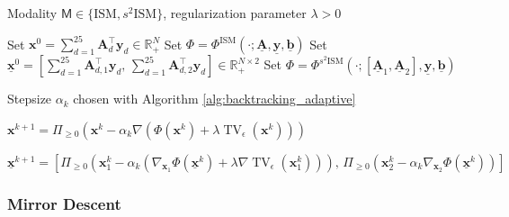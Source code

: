 \documentclass[letterpaper]{article}
\begin{document}
\begin{algorithm}
\caption{Projected Gradient Descent with smoothed TV for ISM and $s^2$ISM}
\label{alg:PGD-TV}
\begin{algorithmic}[1]

\Require Modality $\mathsf{M}\in\{\mathrm{ISM},s^2\mathrm{ISM}\}$, regularization parameter $\lambda>0$

    \State Set $\mathbf x^0=\sum_{d=1}^{25}\mathbf A_d^\top \mathbf y_d \in \mathbb R_+^N$
    \State Set
$
    \Phi
    =
    \Phi^{\mathrm{ISM}}
    (\cdot;\underline{\mathbf A},\underline{\mathbf y},\underline{\mathbf b})
$
    \State Set
$
    \underline{\mathbf x}^0
    =
    \left[
    \sum_{d=1}^{25}\mathbf A_{d,1}^\top\mathbf y_d,\,
    \sum_{d=1}^{25}\mathbf A_{d,2}^\top\mathbf y_d
    \right]
    \in
    \mathbb R_+^{N\times2}
$
    \State Set
$
    \Phi
    =
    \Phi^{s^2\mathrm{ISM}}
    (\cdot;[\underline{\mathbf A}_1,\underline{\mathbf A}_2],\underline{\mathbf y},\underline{\mathbf b})
$
\EndIf

\Require Stepsize $\alpha_k$ chosen with Algorithm \ref{alg:backtracking_adaptive}


        \State
        $
        \mathbf{x}^{k+1}
        =
        \Pi_{\geq0}
        \left(
        \mathbf{x}^k
        -
        \alpha_k
        \nabla
        \left(
        \Phi(\mathbf{x}^k)
        +
        \lambda\operatorname{TV}_\epsilon(\mathbf{x}^k)
        \right)
        \right)
        $

        \State
        $
        \underline{\mathbf{x}}^{k+1}
        =
        \left[
        \Pi_{\geq0}
        \left(
        \mathbf{x}_1^k
        -
        \alpha_k
        \left(
        \nabla_{\mathbf{x}_1}\Phi(\underline{\mathbf{x}}^k)
        +
        \lambda\nabla\operatorname{TV}_\epsilon(\mathbf{x}_1^k)
        \right)
        \right),
        \,
        \Pi_{\geq0}
        \left(
        \mathbf{x}_2^k
        -
        \alpha_k
        \nabla_{\mathbf{x}_2}\Phi(\underline{\mathbf{x}}^k)
        \right)
        \right]
        $
    \EndIf

\EndFor
\end{algorithmic}
\end{algorithm}


\subsubsection{Mirror Descent}
\label{sec:MD}
\end{document}
